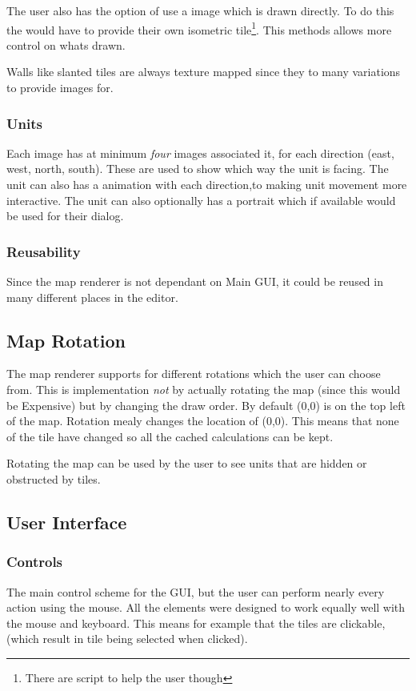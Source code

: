 The user also has the option of use a image which is drawn directly. To do this the would have to provide their own isometric tile\footnote{There are script to help the user though}. This methods allows more control on whats drawn.  

Walls like slanted tiles are always texture mapped since they to many variations to provide images for. 

\subsubsection{Units}
Each image has at minimum \emph{four} images associated it, for each direction (east, west, north, south). These are used to show which way the unit is facing. The unit can also has a animation with each direction,to making unit movement more interactive. The unit can also optionally has a portrait which if available would be used for their dialog.

\subsubsection{Reusability}
Since the map renderer is not dependant on Main GUI, it could be reused in many different places in the editor. 

\subsection{Map Rotation}
The map renderer supports for different rotations which the user can choose from. This is implementation \emph{not} by actually rotating the map (since this would be Expensive) but by changing the draw order. By default (0,0) is on the top left of the map. Rotation mealy changes the location of (0,0). This means that none of the tile have changed so all the cached calculations can be kept. 

Rotating the map can be used by the user to see units that are hidden or obstructed by tiles. 

\clearpage
\subsection{User Interface}
\subsubsection{Controls}
The main control scheme for the GUI, but the user can perform nearly every action using the mouse. All the elements were designed to work equally well with the mouse and keyboard. This means for example that the tiles are clickable, (which result in tile being selected when clicked).  

